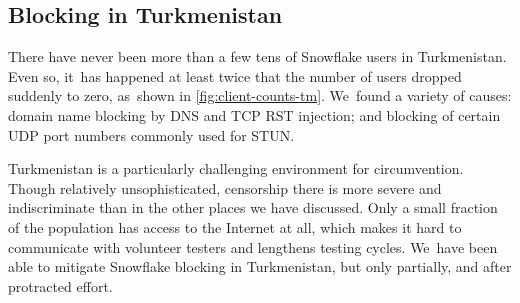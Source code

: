 \documentclass[letterpaper,twocolumn]{article}
\begin{document}
\subsection{Blocking in Turkmenistan}
\label{sec:block-tm}

There have never been more than a few tens of Snowflake users in Turkmenistan.
Even so, it~has happened at least twice
that the number of users dropped suddenly to zero,
as~shown in \autoref{fig:client-counts-tm}.
We~found a variety of causes:
domain name blocking
by DNS and TCP RST injection;
and blocking of certain UDP port numbers
commonly used for STUN.

Turkmenistan is a particularly challenging environment for circumvention.
Though relatively unsophisticated, censorship there
is more severe and indiscriminate
than in the other places we have discussed.
Only a small fraction of the population has access to the Internet at all,
which makes it hard to communicate with volunteer testers
and lengthens testing cycles.
We~have been able to mitigate Snowflake blocking in Turkmenistan,
but only partially, and after protracted effort.
\end{document}
